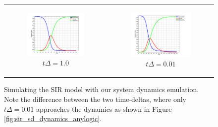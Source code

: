 \begin{figure}
\begin{center}
	\begin{tabular}{c c}
		\begin{subfigure}[b]{0.5\textwidth}
			\centering
			\includegraphics[width=.8\textwidth, angle=0]{./../shared/fig/SIR_SD_DYNAMICS_1000Agents_10dt.png}
			\caption{$t\Delta = 1.0$}
			\label{fig:sd_plot_10dt}
		\end{subfigure}
	
		& 
		
		\begin{subfigure}[b]{0.5\textwidth}
			\centering
			\includegraphics[width=.8\textwidth, angle=0]{./../shared/fig/SIR_SD_DYNAMICS_1000Agents_001dt.png}
			\caption{$t\Delta = 0.01$}
			\label{fig:sd_plot_0.01dt}
		\end{subfigure}
	\end{tabular}
	
	\caption{Simulating the SIR model with our system dynamics emulation. Note the difference between the two time-deltas, where only $t\Delta = 0.01$ approaches the dynamics as shown in Figure \ref{fig:sir_sd_dynamics_anylogic}.}
	\label{fig:sd_plots}
\end{center}
\end{figure}

